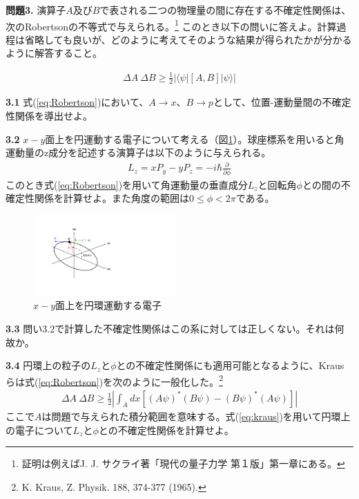 \documentclass[11pt,pra,aps]{revtex4}
\begin{document}
\noindent
{\bf 問題3.}
演算子$A$及び$B$で表される二つの物理量の間に存在する不確定性関係は、次のRobertsonの不等式で与えられる。\footnote{証明は例えばJ. J. サクライ著「現代の量子力学 第１版」第一章にある。}
このとき以下の問いに答えよ。計算過程は省略しても良いが、どのように考えてそのような結果が得られたかが分かるように解答すること。

\begin{align}
  \Delta A\ \Delta B \geq \frac{1}{2}|\langle\psi|[A,B]|\psi\rangle|\label{eq:Robertson}
\end{align}

\noindent
{\bf 3.1} 式(\ref{eq:Robertson})において、$A\rightarrow x$、$B\rightarrow p$として、位置-運動量間の不確定性関係を導出せよ。

\noindent
{\bf 3.2} $x-y$面上を円運動する電子について考える（図\ref{fig:circ}）。球座標系を用いると角運動量のz成分を記述する演算子は以下のように与えられる。
\begin{align}
  L_z=xP_y-yP_z=-i\hbar\frac{\partial}{\partial \phi}
\end{align}
このとき式(\ref{eq:Robertson})を用いて角運動量の垂直成分$L_z$と回転角$\phi$との間の不確定性関係を計算せよ。また角度の範囲は$0\leq \phi < 2\pi$である。

\begin{figure}
  \centering
  \includegraphics[width=5.5cm]{circular-motion.pdf}
  \caption{\label{fig:circ} $x-y$面上を円環運動する電子}
\end{figure}

\noindent
{\bf 3.3} 問い3.2で計算した不確定性関係はこの系に対しては正しくない。それは何故か。

\noindent
{\bf 3.4} 円環上の粒子の$L_z$と$\phi$との不確定性関係にも適用可能となるように、Krausらは式(\ref{eq:Robertson})を次のように一般化した。\footnote{K. Kraus, Z. Physik. 188, 374-377 (1965).}
\begin{align}
  \Delta A\ \Delta B \geq \frac{1}{2}\left|\int_A dx \left[(A\psi)^{*} (B\psi) - (B\psi)^{*} (A\psi)\right]\right|\label{eq:kraus}
\end{align}
ここで$A$は問題で与えられた積分範囲を意味する。式(\ref{eq:kraus})を用いて円環上の電子について$L_z$と$\phi$との不確定性関係を計算せよ。
\end{document}
